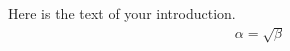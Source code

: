 \documentclass{article}
\begin{document}
Here is the text of your introduction.
\begin{align}
    \alpha = \sqrt{ \beta }
\end{align}
\end{document}
